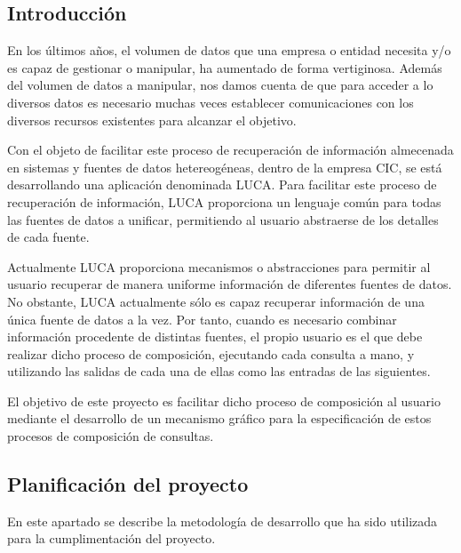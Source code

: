 \documentclass[a4paper,12pt]{article}
\begin{document}
		\subsection{Introducción}
	
	
			En los últimos años, el volumen de datos que una empresa o entidad necesita y/o es capaz de gestionar o manipular, ha aumentado de forma vertiginosa. Además del volumen de datos a manipular, nos damos cuenta de que para acceder a lo diversos datos es necesario muchas veces establecer comunicaciones con los diversos recursos existentes para alcanzar el objetivo.
			
			\vspace{5mm}
			
			
			 Con el objeto de facilitar este proceso de recuperación de información almecenada en sistemas y fuentes de datos hetereogéneas, dentro de la empresa	CIC, se está desarrollando una aplicación denominada LUCA. Para	facilitar este proceso de recuperación de información, LUCA proporciona un lenguaje común para todas las fuentes de datos a unificar, permitiendo al
			usuario abstraerse de los detalles de cada fuente.
			
			\vspace{5mm}
			
			 Actualmente LUCA proporciona mecanismos o abstracciones para permitir al	usuario recuperar de manera uniforme información de diferentes fuentes de datos. No obstante, LUCA actualmente sólo es capaz recuperar información de una única fuente de datos a la vez. Por tanto, cuando es necesario combinar información procedente de distintas fuentes, el propio usuario es el que debe realizar dicho	proceso de composición, ejecutando cada consulta a mano, y utilizando las salidas de cada una de ellas como las entradas de las siguientes.
			 
			 \vspace{5mm}
			 
			 El objetivo de este proyecto es facilitar dicho proceso de composición al usuario mediante el desarrollo de un mecanismo gráfico para la especificación de estos procesos de composición de consultas.
			 
	 
	 	\subsection{Planificación del proyecto}
	 	
	 	En este apartado se describe la metodología de desarrollo que ha sido utilizada para la cumplimentación del proyecto. 
	 	
\end{document}
